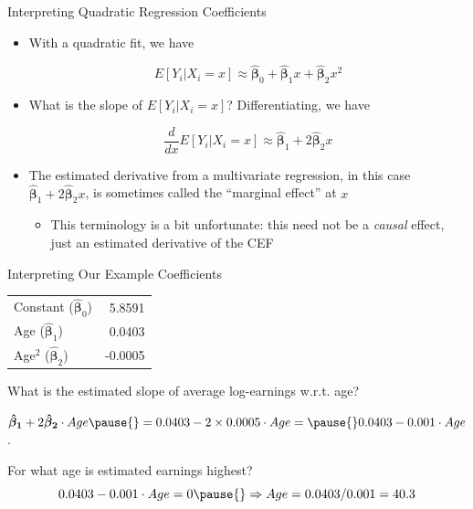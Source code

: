\documentclass[11pt,english,handout]{beamer}
\newenvironment{wideitemize}{\itemize\addtolength{\itemsep}{10pt}}{\enditemize}
\begin{document}
	
	\begin{frame}{Interpreting Quadratic Regression Coefficients}
		\begin{itemize}
			\item 
			With a quadratic fit, we have 
			
			$$E[Y_i | X_i =x] \approx \bm{\hat\beta}_0 +  \bm{\hat\beta}_1 x + \bm{\hat\beta}_2 x^2$$
			\smallskip

			\pause
			\item
			What is the slope of $ E[Y_i | X_i  =x] $? Differentiating, we have \pause{}
			
			$$\dfrac{d}{dx} E[Y_i | X_i =x] \approx  \bm{\hat\beta}_1  + 2 \bm{\hat\beta}_2 x$$
			\smallskip

			
			\pause
			\item
			The estimated derivative from a multivariate regression, in this case $ \bm{\hat\beta}_1  + 2 \bm{\hat\beta}_2 x$, is sometimes called the ``marginal effect'' at $x$
				\smallskip

				\begin{itemize}
					\item 
					This terminology is a bit unfortunate: this need not be a \textit{causal} effect, just an estimated derivative of the CEF
				\end{itemize}
				
		\end{itemize}
	\end{frame}

\begin{frame}{Interpreting Our Example Coefficients}
		\begin{tabular}{lr}
		Constant ($\bm\hat\beta_0$) & 5.8591 \\
		Age ($\bm\hat\beta_1$) & 0.0403 \\
		Age$^2$ ($\bm\hat\beta_2$) & -0.0005
	\end{tabular}
\medskip
	
\begin{wideitemize}
	\item
	What is the estimated slope of average log-earnings w.r.t. age? \pause
	
	\item
	$\bm{\hat\beta_1} + 2 \bm{\hat\beta_2} \cdot Age \pause{} = 0.0403 - 2 \times 0.0005\cdot Age =  \pause{} 0.0403 - 0.001 \cdot Age$.
	
	\pause
	\item
	For what age is estimated earnings highest? \pause
	$$0.0403 - 0.001 \cdot Age = 0 \pause{} \Rightarrow Age = 0.0403 / 0.001 = 40.3 $$
	
\end{wideitemize}	
\end{frame}
	
\end{document}
